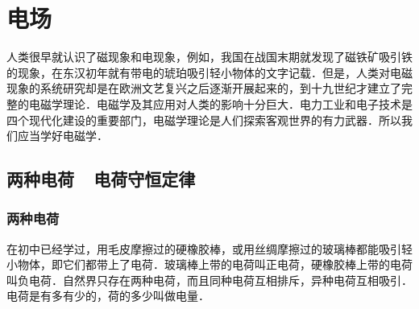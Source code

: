 \chapter{电场}\label{chapter-electric-field}

人类很早就认识了磁现象和电现象，例如，我国在战国末期就发现了磁铁矿吸引铁的现象，在东汉初年就有带电的琥珀吸引轻小物体的文字记载．但是，人类对电磁现象的系统研究却是在欧洲文艺复兴之后逐渐开展起来的，到十九世纪才建立了完整的电磁学理论．电磁学及其应用对人类的影响十分巨大．电力工业和电子技术是四个现代化建设的重要部门，电磁学理论是人们探索客观世界的有力武器．所以我们应当学好电磁学．

\section{两种电荷~~电荷守恒定律}
\subsection{两种电荷}
在初中已经学过，用毛皮摩擦过的硬橡胶棒，或用丝绸摩擦过的玻璃棒都能吸引轻小物体，即它们都带上了电荷．玻璃棒上带的电荷叫正电荷，硬橡胶棒上带的电荷叫负电荷．自然界只存在两种电荷，而且同种电荷互相排斥，异种电荷互相吸引．电荷是有多有少的，荷的多少叫做电量．
